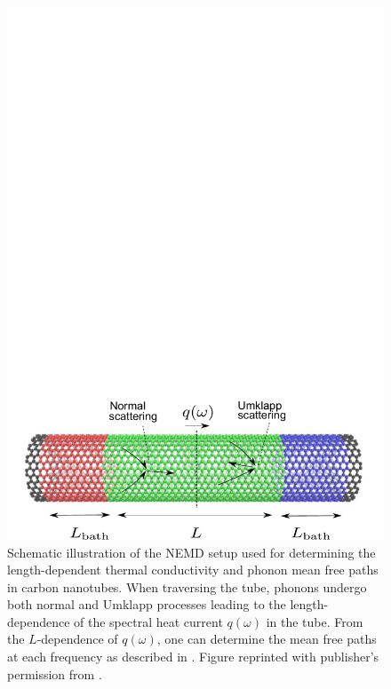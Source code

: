 \begin{figure}[tb]
 \begin{center}
  \includegraphics[width=.89\columnwidth]{pics/cnt_fig1.pdf} 
  \caption{Schematic illustration of the NEMD setup used for determining the length-dependent thermal conductivity and phonon mean free paths in carbon nanotubes. When traversing the tube, phonons undergo both normal and Umklapp processes leading to the length-dependence of the spectral heat current $q(\omega)$ in the tube. From the $L$-dependence of $q(\omega)$, one can determine the mean free paths at each frequency as described in . Figure reprinted with publisher's permission from .}  
\label{fig:cnt_fig1}
 \end{center}
\end{figure}

